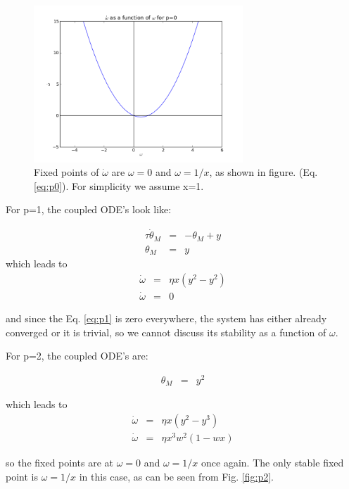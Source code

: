 \begin{figure}[h]
\centering
\includegraphics[width=0.7\textwidth]{./p0.png}
\caption{Fixed points of $\dot \omega$ are $\omega = 0$ and $\omega = 1/x$, as shown in figure. (Eq. \ref{eq:p0}). For simplicity we assume x=1.}
\label{fig:p0}
\end{figure}

For p=1, the coupled ODE's look like: 

\begin{eqnarray}
\tau \dot \theta_M &=&  -\theta_M + y \\
\theta_M &=& y
\end{eqnarray}
which leads to
\begin{eqnarray}
\dot \omega &=& \eta x (y^2-y^2) \\
\dot \omega &=& 0 \label{eq:p1}
\end{eqnarray}

and since the Eq. \ref{eq:p1} is zero everywhere, the system has either already converged or it is trivial, so we cannot discuss its stability as a function of $\omega$.

For p=2, the coupled ODE's are: 

\begin{eqnarray}
\theta_M &=& y^2
\end{eqnarray}

which leads to
\begin{eqnarray}
\dot \omega &=& \eta x (y^2-y^3) \\
\dot \omega &=&  \eta x^3w^2(1-wx) \label{eq:p2}
\end{eqnarray}

so the fixed points are at $\omega = 0$ and $\omega = 1/x$ once again. The only stable fixed point is $\omega = 1/x$ in this case, as can be seen from Fig. \ref{fig:p2}. 

